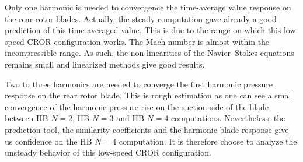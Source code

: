 Only one harmonic is needed to convergence the time-average value response on the
rear rotor blades. Actually, the steady computation gave already a good prediction
of this time averaged value. This is due to the range on which this
low-speed CROR configuration works. The Mach number is almost within the
incompressible range. As such, the non-linearities of the Navier--Stokes equations
remains small and linearized methods give good results.

Two to three harmonics are needed to converge the first harmonic 
pressure response on the rear rotor blade. This is rough estimation
as one can see a small convergence of the
harmonic pressure rise on the suction side of the blade between HB $N=2$,
HB $N=3$ and HB $N=4$ computations. Nevertheless, the prediction tool, the
similarity coefficients and the harmonic blade response give us confidence on
the HB $N=4$ computation. It is therefore choose to analyze the unsteady behavior
of this low-speed CROR configuration.
